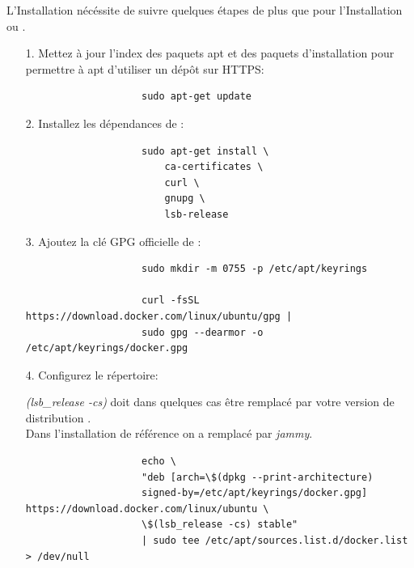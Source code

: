 \documentclass[internal]{nhitec_design}
\begin{document}
        L'Installation \linux{} nécéssite de suivre quelques étapes de plus que pour l'Installation \macos{} ou \windows{}.\\
        \begin{itemize}
     
            \item[1.] Mettez à jour l'index des paquets apt et des paquets d'installation pour permettre à apt d'utiliser un dépôt sur HTTPS:
            
                \begin{lstlisting}
                    sudo apt-get update
                \end{lstlisting}

            \item[2.] Installez les dépendances de \docker{}:

                \begin{lstlisting}
                    sudo apt-get install \
                        ca-certificates \
                        curl \
                        gnupg \
                        lsb-release
                \end{lstlisting}

            \item[3.] Ajoutez la clé GPG officielle de \docker{}:

                \begin{lstlisting}
                    sudo mkdir -m 0755 -p /etc/apt/keyrings

                    curl -fsSL https://download.docker.com/linux/ubuntu/gpg | 
                    sudo gpg --dearmor -o /etc/apt/keyrings/docker.gpg
                \end{lstlisting}

            \item[4.] Configurez le répertoire:\\

                \begin{footnotesize}
                    \textit{\textdollar(lsb\_release -cs)} doit dans quelques cas être remplacé par votre version de distribution \linux{}.\\
                    Dans l'installation de référence on a remplacé par \textit{jammy}.
                \end{footnotesize}
                \begin{lstlisting}
                    echo \
                    "deb [arch=\$(dpkg --print-architecture) 
                    signed-by=/etc/apt/keyrings/docker.gpg] https://download.docker.com/linux/ubuntu \
                    \$(lsb_release -cs) stable" 
                    | sudo tee /etc/apt/sources.list.d/docker.list > /dev/null
                \end{lstlisting}


\end{itemize}
\end{document}
